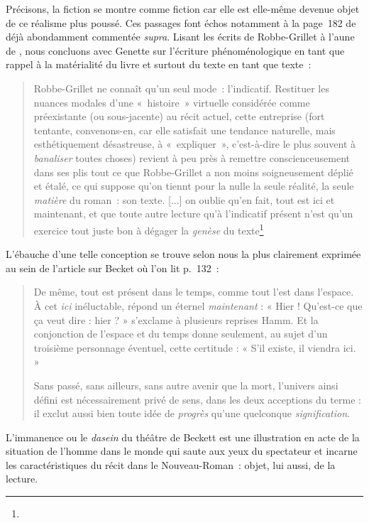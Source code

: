 \documentclass[12pt, a4paper]{article}
\begin{document}
Précisons, la fiction se montre comme fiction car elle est elle-même devenue objet de ce réalisme plus poussé. %
Ces passages font échos notamment à la page~182 de \punr{} déjà abondamment commentée \textit{supra}.
Lisant les écrits de Robbe-Grillet à l'aune de \punr{}, nous concluons avec Genette sur l'écriture phénoménologique en tant que rappel à la matérialité du livre et surtout du texte en tant que texte~: 
\begin{quote}
    Robbe-Grillet ne connaît qu'un seul mode~: l'indicatif. Restituer les nuances modales d'une «~histoire~» virtuelle considérée comme préexistante (ou sous-jacente) au récit actuel, cette entreprise (fort tentante, convenons-en, car elle satisfait une tendance naturelle, mais esthétiquement désastreuse, à «~expliquer~», c'est-à-dire le plus souvent à \textit{banaliser} toutes choses) revient à peu près à remettre conscienceusement dans ses plis tout ce que Robbe-Grillet a non moins soigneusement déplié et étalé, ce qui suppose qu'on tiennt pour la nulle la seule réalité, la seule \textit{matière} du roman~: son texte. [...] on oublie qu'en fait, tout est ici et maintenant, et que toute autre lecture qu'à l'indicatif présent n'est qu'un exercice tout juste bon à dégager la \textit{genèse} du texte\footnote{}
\end{quote}
L'ébauche d'une telle conception se trouve selon nous la plus clairement exprimée au sein de l'article sur Becket où l'on lit p.~132~:
\begin{quote}
    De même, tout est présent dans le temps, comme tout l’est dans l’espace. À cet \textit{ici} inéluctable, répond un éternel \textit{maintenant} : « Hier ! Qu’est-ce que ça veut dire : hier ? » s’exclame à plusieurs reprises Hamm. Et la conjonction de l’espace et du temps donne seulement, au sujet d’un troisième personnage éventuel, cette certitude : « S’il existe, il viendra ici. »

    Sans passé, sans ailleurs, sans autre avenir que la mort, l’univers ainsi défini est nécessairement privé de sens, dans les deux acceptions du terme : il exclut aussi bien toute idée de \textit{progrès} qu’une quelconque \textit{signification}.
\end{quote}
L'immanence ou le \textit{dasein} du théâtre de Beckett est une illustration en acte de la situation de l'homme dans le monde qui saute aux yeux du spectateur et incarne les caractéristiques du récit dans le Nouveau-Roman~: objet, lui aussi, de la lecture.
\end{document}
